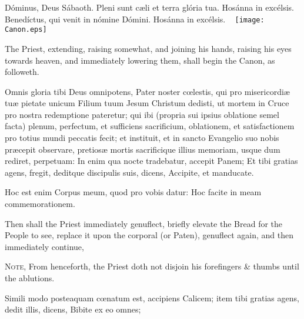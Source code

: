  Dóminus, Deus Sábaoth. Pleni sunt c{\ae}li et terra glória tua. Hosánna in excélsis. Benedíctus, {} qui venit in nómine Dómini. Hosánna in excélsis.
\clearpage
\checkoddpage
\ifoddpage \thispagestyle{empty}
~\clearpage\fi
\thispagestyle{empty}
\texttt{[image: Canon.eps]}
\setcounter{margcount}{1}
\clearpage
{}
\begin{rubric}
    The Priest, extending, raising somewhat, and joining his hands, raising his eyes towards heaven, and immediately lowering them, shall begin the Canon, as followeth.
\end{rubric}
Omnis gloria tibi Deus omnipotens, Pater noster cœlestis, qui pro misericordiæ tuæ pietate unicum Filium tuum Jesum Christum dedisti, ut mortem in Cruce pro nostra redemptione pateretur; qui ibi (propria sui ipsius oblatione semel facta) plenum, perfectum, et sufficiens sacrificium, oblationem, et satisfactionem pro totius mundi peccatis fecit; et instituit, et in sancto Evangelio suo nobis præcepit observare, pretiosæ mortis sacrificique illius memoriam, usque dum rediret, perpetuam:
\noindent
In enim qua nocte tradebatur, accepit Panem; Et tibi gratias {} agens, fregit, deditque discipulis suis, dicens, Accipite, et manducate.
\begin{center}
\large{Hoc est enim Corpus meum, quod pro vobis datur: Hoc facite in meam commemorationem.}
\end{center}
\begin{rubric}
    Then shall the Priest immediately genuflect, briefly elevate the Bread for the People to see, replace it upon the corporal (or Paten), genuflect again, and then immediately continue,\par
    \textsc{Note,} From henceforth, the Priest doth not disjoin his forefingers \& thumbs until the ablutions.
\end{rubric}\par\noindent
Simili modo posteaquam cœnatum est, accipiens Calicem; item tibi gratias {} agens, dedit illis, dicens, Bibite ex eo omnes;
